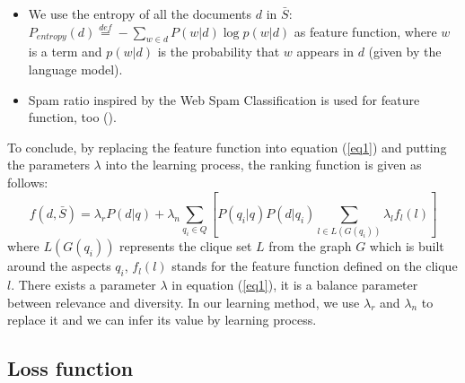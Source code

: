 \documentclass[review]{elsarticle}
\begin{document}
\begin{enumerate}
		\begin{itemize}
			\item We use the entropy of all the documents $d$ in $\bar{S}$: \\
$P_{entropy}(d)\overset{def}{=}-\sum_{w\in d}P(w|d)\log p(w|d)$ as feature function, where $w$ is a term and $p(w|d)$ is the probability that $w$ appears in $d$ (given by the language model).
			\item Spam ratio inspired by the Web Spam Classification is used for feature function, too (\cite{fetterly2004spam}).
		\end{itemize}
\end{enumerate}


To conclude, by replacing the feature function into equation (\ref{eq1}) and putting the parameters $\lambda$ into the learning process, the ranking function is given as follows:
\begin{equation}
	f(d, \bar{S})=\lambda_rP(d|q)+\lambda_n\sum_{q_i\in Q}[P(q_i|q)P(d|q_i)\sum_{l\in L(G(q_i))}\lambda_lf_l(l)]
	\label{eq8}
\end{equation}
where $L(G(q_i))$ represents the clique set $L$ from the graph $G$ which is built around the aspects $q_i$, $f_l(l)$ stands for the feature function defined on the clique $l$. There exists a parameter $\lambda$ in equation (\ref{eq1}), it is a balance parameter between relevance and diversity. In our learning method, we use $\lambda_r$ and $\lambda_n$ to replace it and we can infer its value by learning process.



\subsection{Loss function}
%
%
\end{document}
